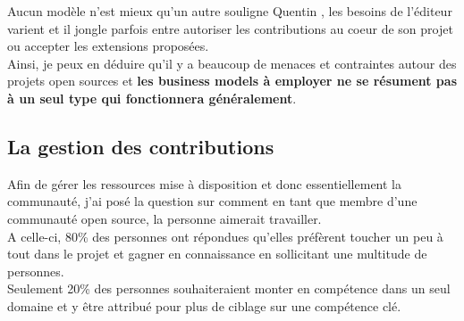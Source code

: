 			Aucun modèle n'est mieux qu'un autre souligne Quentin , les besoins de l'éditeur varient et il jongle parfois entre autoriser les contributions au coeur de son projet ou accepter les extensions proposées.\\

			Ainsi, je peux en déduire qu'il y a beaucoup de menaces et contraintes autour des projets open sources et \textbf{les business models à employer ne se résument pas à un seul type qui fonctionnera généralement}.

		\subsection{La gestion des contributions}

			Afin de gérer les ressources mise à disposition et donc essentiellement la communauté, j'ai posé la question sur comment en tant que membre d'une communauté open source, la personne aimerait travailler.\\

			A celle-ci, 80\% des personnes ont répondues qu'elles préfèrent toucher un peu à tout dans le projet et gagner en connaissance en sollicitant une multitude de personnes.\\

			Seulement 20\% des personnes souhaiteraient monter en compétence dans un seul domaine et y être attribué pour plus de ciblage sur une compétence clé.


